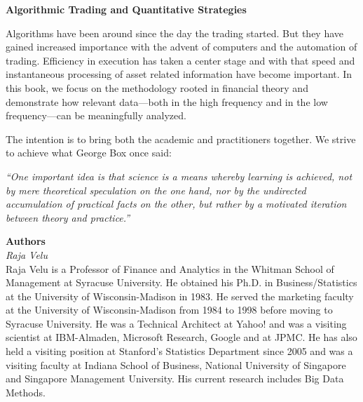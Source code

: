 \begin{center} {\large\bfseries Algorithmic Trading and Quantitative Strategies} \end{center}


Algorithms have been around since the day the trading started. But they have gained increased importance with the advent of computers and the automation of trading. Efficiency in execution has taken a center stage and with that speed and instantaneous processing of asset related information have become important. In this book, we focus on the methodology rooted in financial theory and demonstrate how relevant data---both in the high frequency and in the low frequency---can be meaningfully analyzed. 


The intention is to bring both the academic and practitioners together. We strive to achieve what George Box once said: \par
\begin{center}
\begin{minipage}[t]{0.7\textwidth}
	\raggedright
  	{\itshape``One important idea is that science is a means whereby learning is achieved, not by mere theoretical speculation on the one hand, nor by the undirected accumulation of practical facts on the other, but rather by a motivated iteration between theory and practice.''}
\end{minipage} 
\end{center}



\newpage



{\noindent \Large\bfseries Authors} \\[0.2cm]


{\noindent\large\itshape Raja Velu} \\[0.2cm]
\noindent Raja Velu is a Professor of Finance and Analytics in the Whitman School of Management at Syracuse University. He obtained his Ph.D. in Business/Statistics at the University of Wisconsin-Madison in 1983. He served the marketing faculty at the University of Wisconsin-Madison from 1984 to 1998 before moving to Syracuse University. He was a Technical Architect at Yahoo! and was a visiting scientist at IBM-Almaden, Microsoft Research, Google and at JPMC. He has also held a visiting position at Stanford's Statistics Department since 2005 and was a visiting faculty at Indiana School of Business, National University of Singapore and Singapore Management University. His current research includes Big Data Methods. \\


